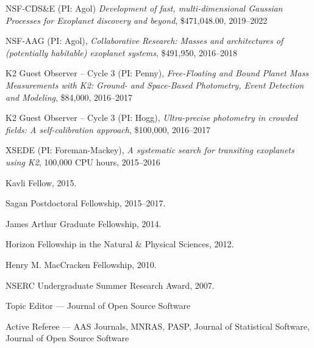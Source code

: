 \documentclass[12pt,letterpaper]{article}
\begin{document}
\begin{list}{}{\cvlist}
  
\end{list}

\begin{list}{}{\cvlist}
  \item NSF-CDS\&E (PI: Agol)
        \emph{Development of fast, multi-dimensional Gaussian Processes for Exoplanet discovery and beyond},
        \$471,048.00, 2019--2022

  \item
        NSF-AAG (PI: Agol),
        \emph{Collaborative Research: Masses and architectures of (potentially
          habitable) exoplanet systems},
        \$491,950, 2016--2018

  \item
        K2 Guest Observer -- Cycle 3 (PI: Penny),
        \emph{Free-Floating and Bound Planet Mass Measurements with K2: Ground- and
          Space-Based Photometry, Event Detection and Modeling},
        \$84,000, 2016--2017

  \item
        K2 Guest Observer -- Cycle 3 (PI: Hogg),
        \emph{Ultra-precise photometry in crowded fields: A self-calibration
          approach},
        \$100,000, 2016--2017

  \item
        XSEDE (PI: Foreman-Mackey),
        \emph{A systematic search for transiting exoplanets using K2},
        100,000 CPU hours, 2015--2016
\end{list}


\begin{list}{}{\cvlist}

  \item Kavli Fellow, 2015.
  \item Sagan Postdoctoral Fellowship, 2015--2017.
  \item James Arthur Graduate Fellowship, 2014.
  \item Horizon Fellowship in the Natural \& Physical Sciences, 2012.
  \item Henry M. MacCracken Fellowship, 2010.
  \item NSERC Undergraduate Summer Research Award, 2007.

\end{list}


\begin{list}{}{\cvlist}
  \item Topic Editor --- Journal of Open Source Software
  \item Active Referee ---
        AAS Journals,
        MNRAS,
        PASP,
        Journal of Statistical Software,
        Journal of Open Source Software
\end{list}
\end{document}
